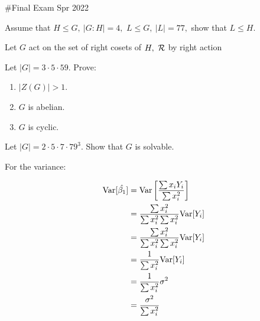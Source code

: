\documentclass{article}
\begin{document}
\maketitle
\#Final Exam Spr 2022\\
\pagebreak

\begin{homeworkProblem}
    Assume that $H \leq G, \ \lvert G:H \rvert = 4,$ 
    $L \leq G, \ \lvert L \rvert = 77,$ show that $L \leq H$. \\
    \solution 

    Let $G$ act on the set of right cosets of $H, \ \cR$ by right action



\end{homeworkProblem}

\pagebreak


\begin{homeworkProblem}
    Let $\lvert G \rvert = 3 \cdot 5 \cdot 59$. Prove:
    \begin{enumerate}
        \item $\lvert Z(G) \rvert > 1$.
        \item $G$ is abelian.
        \item $G$ is cyclic.
    \end{enumerate}
    \solution 
    

\end{homeworkProblem}

\pagebreak

\begin{homeworkProblem}
    Let $\lvert G \rvert = 2 \cdot 5 \cdot 7 \cdot 79^3$.
    Show that $G$ is solvable.\\
    \solution


    For the variance:

    \[
        \begin{split}
            \mathrm{Var}[\hat{\beta_1}]
            &= \mathrm{Var} \left[ \frac{
                \sum {x_i Y_i}
            }{
                \sum x_i^2
            }\right]
            \\
            &=
            \frac{
                \sum {x_i^2}
            }{
                \sum x_i^2 \sum x_i^2
            } \mathrm{Var}[Y_i]
            \\
            &=
            \frac{
                \sum {x_i^2}
            }{
                \sum x_i^2 \sum x_i^2
            } \mathrm{Var}[Y_i]
            \\
            &=
            \frac{
                1
            }{
                \sum x_i^2
            } \mathrm{Var}[Y_i]
            \\
            &=
            \frac{
                1
            }{
                \sum x_i^2
            } \sigma^2
            \\
            &=
            \frac{
                \sigma^2
            }{
                \sum x_i^2
            }
        \end{split}
    \]

\end{homeworkProblem}
\end{document}
